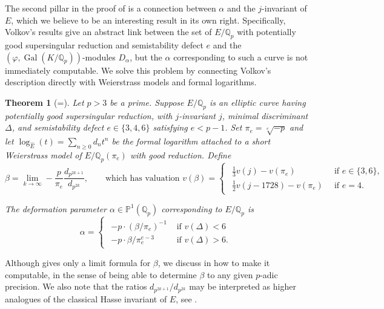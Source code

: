 \documentclass{amsart}
\newcommand{\Qp}{\mathbb{Q}_p}
\newtheorem{theorem}{Theorem}
\theoremstyle{definition}
\newcommand{\Q}{\mathbb{Q}}
\newcommand{\Gal}{\operatorname{Gal}}
\numberwithin{theorem}{section}
\numberwithin{equation}{section}
\begin{document}
The second pillar in the proof of  is a connection between $\alpha$ and the $j$-invariant of $E$, which we believe to be an interesting result in its own right.
Specifically, Volkov's results give an abstract link between the set of $E/\Q_p$ with potentially good supersingular reduction and semistability defect $e$ and the $(\varphi,\Gal(K/\Qp))$-modules $D_{\alpha}$, but the $\alpha$ corresponding to such a curve is not immediately computable. We solve this problem by connecting Volkov's description directly with Weierstrass models and formal logarithms.

\begin{theorem}[=]\label{introthm: formula for beta}
Let $p>3$ be a prime. Suppose $E/\Qp$ is an elliptic curve having potentially good supersingular reduction, with $j$-invariant $j$, minimal discriminant $\Delta$, and semistability defect $e \in \{3,4,6\}$ satisfying $e<p-1$. Set $\pi_e=\sqrt[e]{-p}$ and let $\log_{\hat{E}}(t)=\sum_{n \ge 0} d_nt^n$ be the formal logarithm attached to a short Weierstrass model of $E/\Qp(\pi_e)$ with good reduction. Define
\[
\beta = \lim_{k \to \infty} -\frac{p}{\pi_e} \frac{d_{p^{2k+1}}}{d_{p^{2k}}}, \qquad \text{which has valuation } v(\beta)=\begin{cases}
\begin{array}{lll}
\frac{1}{3}v(j) - v(\pi_e) & \, \text{ if $e \in \{3,6\}$}, \\
\frac{1}{2}v(j-1728) - v(\pi_e) & \,  \text{ if $e =4$.}
\end{array}
\end{cases}
\]

The deformation parameter $\alpha \in \mathbb{P}^1(\Qp)$ corresponding to $E/\Qp$ is
\[
\alpha = \begin{cases}
\begin{array}{cc}
    -p \cdot (\beta/\pi_e)^{-1} & \text{ if } v(\Delta)<6 \\
    -p \cdot \beta/\pi_e^{e-3} & \text{ if } v(\Delta)>6.
    \end{array}
\end{cases}
\]
\end{theorem}


Although  gives only a limit formula for $\beta$, we discuss in  how to make it computable, in the sense of being able to determine $\beta$ to any given $p$-adic precision. We also note that the ratios $d_{p^{2k+1}}/d_{p^{2k}}$ may be interpreted as higher analogues of the classical Hasse invariant of $E$, see .
\end{document}
